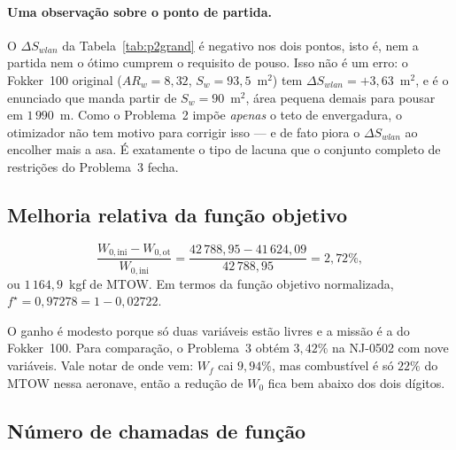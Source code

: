 \paragraph{Uma observação sobre o ponto de partida.}
O $\Delta S_{wlan}$ da Tabela~\ref{tab:p2grand} é negativo nos dois
pontos, isto é, nem a partida nem o ótimo cumprem o requisito de pouso.
Isso não é um erro: o Fokker~100 original ($AR_w = 8{,}32$,
$S_w = 93{,}5$~m$^2$) tem $\Delta S_{wlan} = +3{,}63$~m$^2$, e é o
enunciado que manda partir de $S_w = 90$~m$^2$, área pequena demais para
pousar em $1\,990$~m. Como o Problema~2 impõe \emph{apenas} o teto de
envergadura, o otimizador não tem motivo para corrigir isso --- e de fato
piora o $\Delta S_{wlan}$ ao encolher mais a asa. É exatamente o tipo de
lacuna que o conjunto completo de restrições do Problema~3 fecha.

\subsection{Melhoria relativa da função objetivo}
\label{sec:p2q2}

\begin{equation}
\frac{W_{0,\mathrm{ini}} - W_{0,\mathrm{ot}}}{W_{0,\mathrm{ini}}}
= \frac{42\,788{,}95 - 41\,624{,}09}{42\,788{,}95}
= 2{,}72\% ,
\label{eq:p2ganho}
\end{equation}
ou $1\,164{,}9$~kgf de MTOW. Em termos da função objetivo normalizada,
$f^\star = 0{,}97278 = 1 - 0{,}02722$.

O ganho é modesto porque só duas variáveis estão livres e a missão é a
do Fokker~100. Para comparação, o Problema~3 obtém $3{,}42\%$ na NJ-0502
com nove variáveis. Vale notar de onde vem: $W_f$ cai $9{,}94\%$, mas
combustível é só $22\%$ do MTOW nessa aeronave, então a redução de
$W_0$ fica bem abaixo dos dois dígitos.

\subsection{Número de chamadas de função}
\label{sec:p2q3}

\begin{table}[H]
\centering
\caption{Contadores da corrida do SLSQP na aeronave padrão.}
\label{tab:p2corrida}
\small

\end{table}

